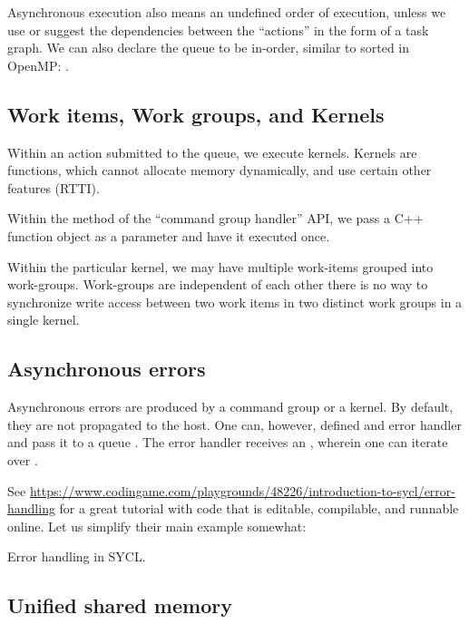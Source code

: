 Asynchronous execution also means an undefined order of execution, 
unless we use  or suggest the dependencies between the ``actions'' in the form of a task graph.
We can also declare the queue to be in-order, similar to sorted in OpenMP:
.


 \subsection{Work items, Work groups, and Kernels}

Within an action submitted to the queue, we execute kernels.
 Kernels are  functions, which cannot allocate memory dynamically, and use certain other features (RTTI). 

Within the  method of the ``command group handler'' API, 
we pass a C++ function object as a parameter and have it executed once. 

Within the particular kernel, we may have multiple work-items grouped into work-groups. 
Work-groups are independent of each other there is no way to synchronize write access between two work items in two distinct work groups in a single kernel. 

\subsection{Asynchronous errors}

Asynchronous errors are produced by a command group or a kernel. By default, they are not propagated to the host. One can, however, defined and error handler and pass it to a queue .
The error handler receives an , wherein one can iterate over .

See \url{https://www.codingame.com/playgrounds/48226/introduction-to-sycl/error-handling} for a great tutorial with code that is editable, compilable, and runnable online. Let us simplify their main example somewhat:

\raggedbottom
\begin{codebox}[]{\href{https://godbolt.org/z/}{\ExternalLink}}
\footnotesize Error handling in SYCL.
\tcblower
{}
\end{codebox}
  
\subsection{Unified shared memory}
 
